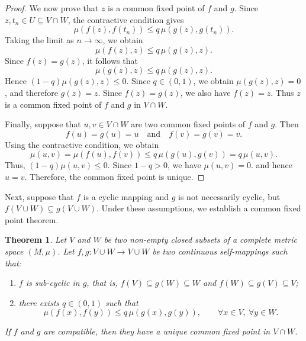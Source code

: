 \documentclass[11pt,a4paper,margin=1in]{amsart}
\theoremstyle{plain}
\newtheorem{theorem}{Theorem}[section]
\theoremstyle{definition}
\theoremstyle{remark}
\begin{document}
\begin{proof}
We now prove that $z$ is a common fixed point of $f$ and $g$. Since
$z,t_n\in U\subseteq V\cap W$, the contractive condition gives
\[
\mu(f(z),f(t_n))
\leq
q\,\mu(g(z),g(t_n)).
\]
Taking the limit as $n\to\infty$, we obtain
\[
\mu(f(z),z)
\leq
q\,\mu(g(z),z).
\]
Since $f(z)=g(z)$, it follows that
\[
\mu(g(z),z)
\leq
q\,\mu(g(z),z).
\]
Hence $(1-q)\mu(g(z),z)\leq0$. Since $q\in(0,1)$, we obtain $\mu(g(z),z)=0$, 
and therefore $g(z)=z$. 
Since $f(z)=g(z)$, we also have $f(z)=z$. Thus $z$ is a common fixed point of $f$ and $g$ in $V\cap W$.

Finally, suppose that $u,v\in V\cap W$ are two common fixed points of
$f$ and $g$. Then
\[
f(u)=g(u)=u
\quad\text{and}\quad
f(v)=g(v)=v.
\]
Using the contractive condition, we obtain
\[
\mu(u,v)
=
\mu(f(u),f(v))
\leq
q\,\mu(g(u),g(v))
=
q\,\mu(u,v).
\]
Thus, $(1-q)\mu(u,v)\leq0$. 
Since $1-q>0$, we have $\mu(u,v)=0$. 
and hence $u=v$. Therefore, the common fixed point is unique.
\end{proof}

Next, suppose that $f$ is a cyclic mapping and $g$ is not necessarily
cyclic, but $f(V\cup W)\subseteq g(V\cup W)$. Under these assumptions, we establish a common fixed point theorem.

\begin{theorem}\label{thm:sub-cyclic-common-fixed-point}
Let $V$ and $W$ be two non-empty closed subsets of a complete metric
space $(M,\mu)$. Let $f,g:V\cup W\to V\cup W$ be two continuous self-mappings such that:

\begin{enumerate}
    \item[(i)] $f$ is sub-cyclic in $g$, that is, $ f(V)\subseteq g(W)\subseteq W$ and $ f(W)\subseteq g(V)\subseteq V$;
   

    \item[(ii)] there exists $q\in(0,1)$ such that
    \[
    \mu(f(x),f(y))
    \leq
    q\,\mu(g(x),g(y)),
    \qquad \forall x\in V,\ \forall y\in W.
    \]
\end{enumerate}
If $f$ and $g$ are compatible, then they have a unique common fixed
point in $V\cap W$.
\end{theorem}
\end{document}
